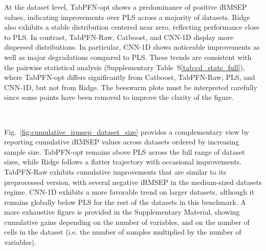 \documentclass{article}
\begin{document}
At the dataset level, TabPFN-opt shows a predominance of positive iRMSEP values, indicating improvements over PLS across a majority of datasets. Ridge also exhibits a stable distribution centered near zero, reflecting performance close to PLS. In contrast, TabPFN-Raw, Catboost, and CNN-1D display more dispersed distributions. In particular, CNN-1D shows noticeable improvements as well as major degradations compared to PLS. These trends are consistent with the pairwise statistical analysis (Supplementary Table~S\ref{tab:cd_stats_full}), where TabPFN-opt differs significantly from Catboost, TabPFN-Raw, PLS, and CNN-1D, but not from Ridge. The beeswarm plots must be interpreted carefully since some points have been removed to improve the clarity of the figure.

~

Fig.~\ref{fig:cumulative_irmsep_dataset_size} provides a complementary view by reporting cumulative iRMSEP values across datasets ordered by increasing sample size. TabPFN-opt remains above PLS across the full range of dataset sizes, while Ridge follows a flatter trajectory with occasional improvements. TabPFN-Raw exhibits cumulative improvements that are similar to its preprocessed version, with several negative iRMSEP in the medium-sized datasets regime. CNN-1D exhibits a more favorable trend on larger datasets, although it remains globally below PLS for the rest of the datasets in this benchmark. A more exhaustive figure is provided in the Supplementary Material, showing cumulative gains depending on the number of variables, and on the number of cells in the dataset (i.e. the number of samples multiplied by the number of variables).
\end{document}
